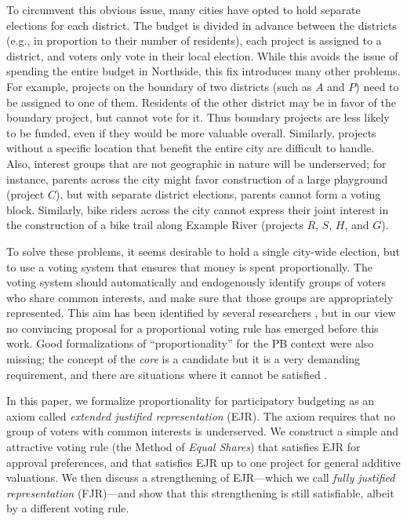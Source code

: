 \documentclass[10pt]{scrartcl}
\theoremstyle{definition}
\theoremstyle{plain}
\begin{document}
To circumvent this obvious issue, many cities have opted to hold separate elections for each district. The budget is divided in advance between the districts (e.g., in proportion to their number of residents), each project is assigned to a district, and voters only vote in their local election. While this avoids the issue of spending the entire budget in Northside, this fix introduces many other problems. For example, projects on the boundary of two districts (such as $A$ and $P$) need to be assigned to one of them. Residents of the other district may be in favor of the boundary project, but cannot vote for it. Thus boundary projects are less likely to be funded, even if they would be more valuable overall. Similarly, projects without a specific location that benefit the entire city are difficult to handle. Also, interest groups that are not geographic in nature will be underserved; for instance, parents across the city might favor construction of a large playground (project $C$), but with separate district elections, parents cannot form a voting block.
Similarly, bike riders across the city cannot express their joint interest in the construction of a bike trail along Example River (projects $R$, $S$, $H$, and $G$).

To solve these problems, it seems desirable to hold a single city-wide election, but to use a voting system that ensures that money is spent proportionally. The voting system should automatically and endogenously identify groups of voters who share common interests, and make sure that those groups are appropriately represented. This aim has been identified by several researchers \citep{aziz2018proportionally,fain2018fair}, but in our view no convincing proposal for a proportional voting rule has emerged before this work. Good formalizations of “proportionality” for the PB context were also missing; the concept of the \emph{core} is a candidate but it is a very demanding requirement, and there are situations where it cannot be satisfied \citep{fain2018fair}.

In this paper, we formalize proportionality for participatory budgeting as an axiom called \emph{extended justified representation} (EJR). The axiom requires that no group of voters with common interests is underserved. We construct a simple and attractive voting rule (the Method of \emph{Equal Shares}) that satisfies EJR for approval preferences, and that satisfies EJR up to one project for general additive valuations. We then discuss a strengthening of EJR---which we call \emph{fully justified representation} (FJR)---and show that this strengthening is still satisfiable, albeit by a different voting rule. 
\end{document}
